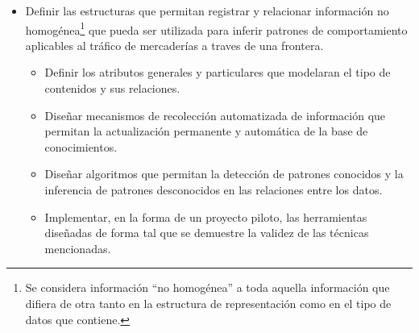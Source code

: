 	
	\begin{itemize}
		\item Definir las estructuras que permitan registrar y relacionar información no homogénea\footnote{Se considera información ``no homogénea'' a toda aquella información que difiera de otra tanto en la estructura de representación como en el tipo de datos que contiene.} que pueda ser utilizada para inferir patrones de comportamiento aplicables al tráfico de mercaderías a traves de una frontera.
		\begin{itemize}
			\item Definir los atributos generales y particulares que modelaran el tipo de contenidos y sus relaciones.
			\item Diseñar mecanismos de recolección automatizada de información que permitan la actualización permanente y automática de la base de conocimientos.
			\item Diseñar algoritmos que permitan la detección de patrones conocidos y la inferencia de patrones desconocidos en las relaciones entre los datos.
			\item Implementar, en la forma de un proyecto piloto, las herramientas diseñadas de forma tal que se demuestre la validez de las técnicas mencionadas.
		\end{itemize}
	\end{itemize}

